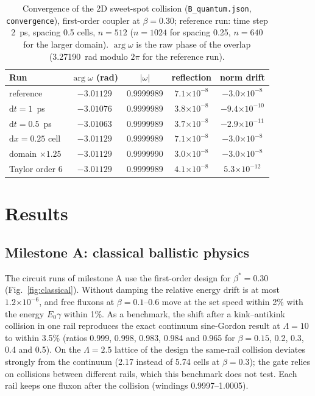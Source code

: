 \documentclass[10pt,twocolumn,letterpaper]{article}
\newcommand{\ee}[1]{\ensuremath{\times10^{#1}}}
\newcommand{\ud}{\mathrm{d}}
\newcommand{\file}[1]{\texttt{#1}}
\begin{document}
\begin{table}[t]
\centering\footnotesize
\caption{Convergence of the 2D sweet-spot collision (\file{B\_\allowbreak{}quantum.\allowbreak{}json}, \file{convergence}), first-order coupler
at $\beta=0.30$; reference run: time step 2~ps, spacing 0.5 cells, $n=512$ ($n=1024$ for spacing 0.25, $n=640$ for the
larger domain). $\arg\omega$ is the raw phase of the overlap (3.27190~rad modulo $2\pi$ for the reference run).}
\label{tab:conv}
\setlength{\tabcolsep}{3pt}
\begin{tabular}{@{}lcccc@{}}
\toprule
Run & $\arg\omega$ (rad) & $|\omega|$ & reflection & norm drift\\
\midrule
reference & $-3.01129$ & 0.9999989 & $7.1\ee{-8}$ & $-3.0\ee{-8}$\\
$\ud t=1$~ps & $-3.01076$ & 0.9999989 & $3.8\ee{-8}$ & $-9.4\ee{-10}$\\
$\ud t=0.5$~ps & $-3.01063$ & 0.9999989 & $3.7\ee{-8}$ & $-2.9\ee{-11}$\\
$\ud x=0.25$ cell & $-3.01129$ & 0.9999989 & $7.1\ee{-8}$ & $-3.0\ee{-8}$\\
domain $\times1.25$ & $-3.01129$ & 0.9999990 & $3.0\ee{-8}$ & $-3.0\ee{-8}$\\
Taylor order 6 & $-3.01129$ & 0.9999989 & $4.1\ee{-8}$ & $5.3\ee{-12}$\\
\bottomrule
\end{tabular}
\end{table}

\section{Results}
\label{sec:results}

\subsection{Milestone A: classical ballistic physics}
\label{sec:resA}
The circuit runs of milestone A use the first-order design for $\beta^*=0.30$ (Fig.~\ref{fig:classical}). Without
damping the relative energy drift is at most $1.2\ee{-6}$, and free fluxons at $\beta=0.1$--0.6 move at the set speed
within 2\% with the energy $E_0\gamma$ within 1\%. As a benchmark, the shift after a kink--antikink collision in one
rail reproduces the exact continuum sine-Gordon result at $\Lambda=10$ to within 3.5\% (ratios 0.999, 0.998, 0.983,
0.984 and 0.965 for $\beta=0.15$, 0.2, 0.3, 0.4 and 0.5). On the $\Lambda=2.5$ lattice of the design the same-rail
collision deviates strongly from the continuum (2.17 instead of 5.74 cells at $\beta=0.3$); the gate relies on
collisions between different rails, which this benchmark does not test. Each rail keeps one fluxon after the collision
(windings 0.9997--1.0005).
\end{document}
